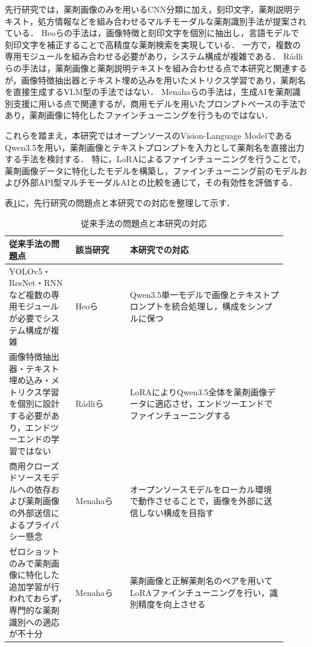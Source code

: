 \documentclass{jsarticle}
\begin{document}
先行研究では，薬剤画像のみを用いるCNN分類に加え，刻印文字，薬剤説明テキスト，処方情報などを組み合わせるマルチモーダルな薬剤識別手法が提案されている．
Heoらの手法は，画像特徴と刻印文字を個別に抽出し，言語モデルで刻印文字を補正することで高精度な薬剤検索を実現している．
一方で，複数の専用モジュールを組み合わせる必要があり，システム構成が複雑である．
Rádliらの手法は，薬剤画像と薬剤説明テキストを組み合わせる点で本研究と関連するが，画像特徴抽出器とテキスト埋め込みを用いたメトリクス学習であり，薬剤名を直接生成するVLM型の手法ではない．
Menahaらの手法は，生成AIを薬剤識別支援に用いる点で関連するが，商用モデルを用いたプロンプトベースの手法であり，薬剤画像に特化したファインチューニングを行うものではない．

これらを踏まえ，本研究ではオープンソースのVision-Language ModelであるQwen3.5を用い，薬剤画像とテキストプロンプトを入力として薬剤名を直接出力する手法を検討する．
特に，LoRAによるファインチューニングを行うことで，薬剤画像データに特化したモデルを構築し，ファインチューニング前のモデルおよび外部API型マルチモーダルAIとの比較を通じて，その有効性を評価する．

表\ref{tab:related}に，先行研究の問題点と本研究での対応を整理して示す．

\begin{table}[h]
\centering
\caption{従来手法の問題点と本研究の対応}
\label{tab:related}
\small
\setlength{\tabcolsep}{4pt}
\begin{tabular}{p{0.22\linewidth}p{0.18\linewidth}p{0.52\linewidth}}
\hline
従来手法の問題点 & 該当研究 & 本研究での対応 \\
\hline
YOLOv5・ResNet・RNNなど複数の専用モジュールが必要でシステム構成が複雑 &
Heoら \cite{heo2023pill} &
Qwen3.5単一モデルで画像とテキストプロンプトを統合処理し，構成をシンプルに保つ \\
\hline
画像特徴抽出器・テキスト埋め込み・メトリクス学習を個別に設計する必要があり，エンドツーエンドの学習ではない &
Rádliら \cite{radli2024metric} &
LoRAによりQwen3.5全体を薬剤画像データに適応させ，エンドツーエンドでファインチューニングする \\
\hline
商用クローズドソースモデルへの依存および薬剤画像の外部送信によるプライバシー懸念 &
Menahaら \cite{gemini2024pill} &
オープンソースモデルをローカル環境で動作させることで，画像を外部に送信しない構成を目指す \\
\hline
ゼロショットのみで薬剤画像に特化した追加学習が行われておらず，専門的な薬剤識別への適応が不十分 &
Menahaら \cite{gemini2024pill} &
薬剤画像と正解薬剤名のペアを用いてLoRAファインチューニングを行い，識別精度を向上させる \\
\hline
\end{tabular}
\end{table}
\end{document}

